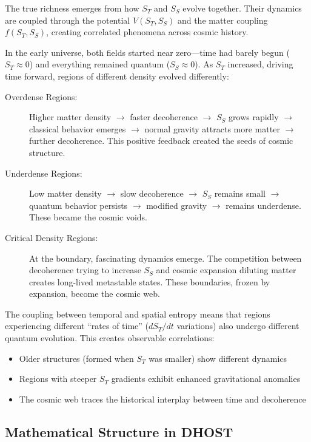 \documentclass[12pt]{article}
\begin{document}
The true richness emerges from how $S_T$ and $S_S$ evolve together. Their dynamics are coupled through the potential $V(S_T, S_S)$ and the matter coupling $f(S_T, S_S)$, creating correlated phenomena across cosmic history.

In the early universe, both fields started near zero---time had barely begun ($S_T \approx 0$) and everything remained quantum ($S_S \approx 0$). As $S_T$ increased, driving time forward, regions of different density evolved differently:

\begin{description}
    \item[Overdense Regions:] Higher matter density $\rightarrow$ faster decoherence $\rightarrow$ $S_S$ grows rapidly $\rightarrow$ classical behavior emerges $\rightarrow$ normal gravity attracts more matter $\rightarrow$ further decoherence. This positive feedback created the seeds of cosmic structure.
    \item[Underdense Regions:] Low matter density $\rightarrow$ slow decoherence $\rightarrow$ $S_S$ remains small $\rightarrow$ quantum behavior persists $\rightarrow$ modified gravity $\rightarrow$ remains underdense. These became the cosmic voids.
    \item[Critical Density Regions:] At the boundary, fascinating dynamics emerge. The competition between decoherence trying to increase $S_S$ and cosmic expansion diluting matter creates long-lived metastable states. These boundaries, frozen by expansion, become the cosmic web.
\end{description}

The coupling between temporal and spatial entropy means that regions experiencing different ``rates of time'' ($dS_T/dt$ variations) also undergo different quantum evolution. This creates observable correlations:
\begin{itemize}
    \item Older structures (formed when $S_T$ was smaller) show different dynamics
    \item Regions with steeper $S_T$ gradients exhibit enhanced gravitational anomalies
    \item The cosmic web traces the historical interplay between time and decoherence
\end{itemize}

\subsection{Mathematical Structure in DHOST}
\end{document}
